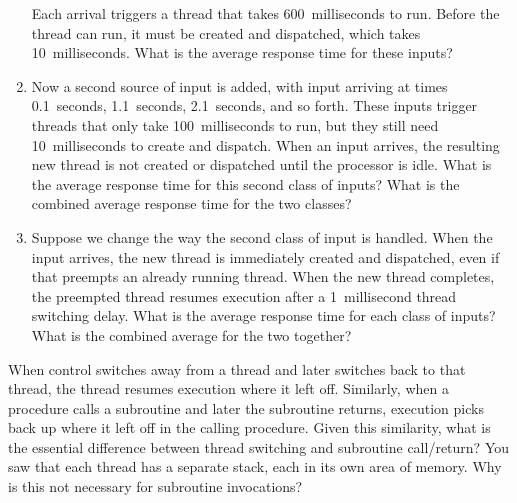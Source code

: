 \begin{chapterEnumerate}
\begin{enumerate}
Each arrival triggers a thread that takes 600~milliseconds to run.
Before the thread can run, it must be created and dispatched, which
takes 10~milliseconds.  What is the average response time for these
inputs?
\item
Now a second source of input is added, with input arriving at times
0.1~seconds, 1.1~seconds, 2.1~seconds, and so forth.  These inputs trigger
threads that only take 100~milliseconds to run, but they still need
10~milliseconds to create and dispatch.  When an input arrives, the
resulting new thread is not created or dispatched until the processor
is idle.  What is the average response time for this second class of
inputs?  What is the combined average response time for the two
classes?
\item
Suppose we change the way the second class of input is handled.  When
the input arrives, the new thread is immediately created and
dispatched, even if that preempts an already running thread.  When the
new thread completes, the preempted thread resumes execution after a
1~millisecond thread switching delay.  What is the average response
time for each class of inputs?  What is the combined average for the
two together?
\end{enumerate}
\item
When control switches away from a thread and later switches back to
that thread, the thread resumes execution where it left off.
Similarly, when a procedure calls a subroutine and later the
subroutine returns, execution picks back up where it left off in the
calling procedure.  Given this similarity, what is the essential
difference between thread switching and subroutine call/return?  You saw
that each thread has a separate stack, each in its own area of
memory.  Why is this not necessary for subroutine invocations?
\end{chapterEnumerate}


